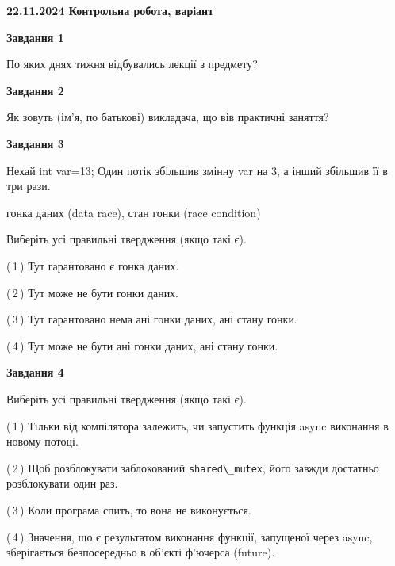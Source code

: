 \documentclass[12pt, ukrainian]{article}
\def\code#1{\Verb!#1!}
\begin{document}
\begin {large}

\textbf{22.11.2024 Контрольна робота, варіант  }\par


{

\begin{center}
\textbf{Завдання 1}
\end{center}

По яких днях тижня відбувались лекції з предмету?


\begin{center}
\textbf{Завдання 2}
\end{center}

Як зовуть (ім'я, по батькові) викладача, що вів практичні заняття?


\begin{center}
\textbf{Завдання 3}
\end{center}

Нехай int var=13; Один потік збільшив змінну var на 3, а інший збільшив її в три рази.

гонка даних (data race), стан гонки (race condition)

Виберіть усі правильні твердження (якщо такі є).\par
\vspace{2mm}
(\,1\,) Тут гарантовано є гонка даних.%

(\,2\,) Тут може не бути гонки даних.%

(\,3\,) Тут гарантовано нема ані гонки даних, ані стану гонки.%

(\,4\,) Тут може не бути ані гонки даних, ані стану гонки.%


\begin{center}
\textbf{Завдання 4}
\end{center}

Виберіть усі правильні твердження (якщо такі є).\par
\vspace{2mm}

(\,1\,) Тільки від компілятора залежить, чи запустить функція async виконання в новому потоці.%

(\,2\,) Щоб розблокувати заблокований \code{shared\_mutex}, його завжди достатньо розблокувати один раз.%

(\,3\,) Коли програма спить, то вона не виконується.%

(\,4\,) Значення, що є результатом виконання функції, запущеної через async, зберігається безпосередньо в об’єкті ф’ючерса (future).%


}
\end{large}
\end{document}
